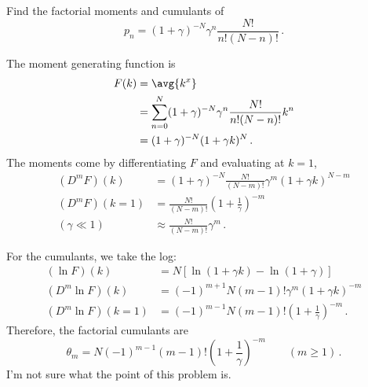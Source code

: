 

Find the factorial moments and cumulants of
\begin{equation*}
  p_n = (1 + \gamma)^{-N} \gamma^n \frac{N!}{n!(N-n)!}
  \, .
\end{equation*}


The moment generating function is
\begin{align*}
  F(k)
  &= \avg{k^x} \\
  &= \sum_{n=0}^N (1 + \gamma)^{-N} \gamma^n \frac{N!}{n!(N-n)!} k^n \\
  &= (1 + \gamma)^{-N} (1 + \gamma k)^N \, .
\end{align*}
The moments come by differentiating $F$ and evaluating at $k=1$,
\begin{align*}
  (D^m F)(k)
  &= (1 + \gamma)^{-N} \frac{N!}{(N-m)!} \gamma^m (1 + \gamma k)^{N-m} \\
  (D^m F)(k=1)
  &= \frac{N!}{(N-m)!} \left(1 + \frac{1}{\gamma} \right)^{-m} \\
  (\gamma \ll 1) \qquad
  &\approx \frac{N!}{(N - m)!} \gamma^m \, .
\end{align*}

For the cumulants, we take the log:
\begin{align*}
  (\ln F)(k)
  &= N \left[ \ln(1 + \gamma k) - \ln(1 + \gamma) \right] \\
  (D^m \ln F)(k)
  &=  (-1)^{m+1} N(m-1)! \gamma^m (1 + \gamma k)^{-m} \\
  (D^m \ln F)(k=1)
  &=  (-1)^{m-1} N(m-1)! \left( 1 + \frac{1}{\gamma} \right)^{-m} \, .
\end{align*}
Therefore, the factorial cumulants are
\begin{equation*}
  \theta_m = N (-1)^{m-1} (m-1)! \left( 1 + \frac{1}{\gamma} \right)^{-m} \qquad (m \geq 1)
  \, .
\end{equation*}
I'm not sure what the point of this problem is.
